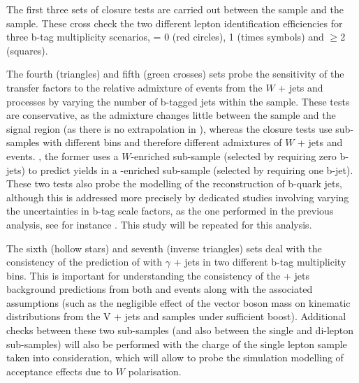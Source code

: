 The first three sets of closure tests are carried out between the \mj
sample and the \ej sample. These cross check the two different lepton
identification efficiencies for three b-tag multiplicity scenarios,
\njet = 0 (red circles), 1 (times symbols) and $\geq$2 (squares).

The fourth (triangles) and fifth (green crosses) sets probe the
sensitivity of the transfer factors to the relative admixture of
events from the $W$ + jets and \ttbar processes by varying the number
of b-tagged jets within the \mj sample. These tests are conservative,
as the admixture changes little between the \mj sample and the signal
region (as there is no extrapolation in \nb), whereas the closure
tests use sub-samples with different \nb bins and therefore different
admixtures of $W$ + jets and \ttbar events. \eg, the former uses a
$W$-enriched sub-sample (selected by requiring zero b-jets) to predict
yields in a \ttbar-enriched sub-sample (selected by requiring one
b-jet).  These two tests also probe the modelling of the
reconstruction of b-quark jets, although this is addressed more
precisely by dedicated studies involving varying the uncertainties in
b-tag scale factors, as the one performed in the previous analysis,
see for instance \cite{CMS_AN_2013-366}. This study will be repeated
for this analysis.

The sixth (hollow stars) and seventh (inverse triangles) sets deal with
the consistency of the prediction of \wej with $\gamma$ + jets in two
different b-tag multiplicity bins. This is important for understanding
the consistency of the \znunu + jets background predictions from both
\wej and \gj events along with the associated assumptions (such
as the negligible effect of the vector boson mass on kinematic
distributions from the V + jets and \gj samples under sufficient
boost). Additional checks between these two sub-samples (and also
between the single and di-lepton sub-samples) will also be performed
with the charge of the single lepton sample taken into consideration,
which will allow to probe the simulation modelling of acceptance
effects due to $W$ polarisation.

